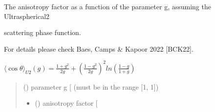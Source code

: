 \documentclass[letterpaper,10pt,english]{sphinxmanual}
\begin{document}

\begin{fulllineitems}
\label{\detokenize{06_anisotropy_factor:skinoptics.anisotropy_factor.costheta_U2}}
\pysigstartsignatures
{}
\pysigstopsignatures
\begin{DUlineblock}{0em}
\item[] The anisotropy factor as a function of the parameter g, assuming the Ultraspherical\sphinxhyphen{}2
\item[] scattering phase function.
\item[] For details please check Baes, Camps \& Kapoor 2022 {[}BCK22{]}.
\end{DUlineblock}

\sphinxAtStartPar
\(\langle \cos\theta \rangle_{U2}(g) = \frac{1+g^2}{2g} + \left(\frac{1-g^2}{2g}\right)^2 ln\left(\frac{1-g}{1+g}\right)\)
\begin{quote}\begin{description}
\sphinxAtStartPar
{} () \textendash{} parameter g {[}\sphinxhyphen{}{]} (must be in the range {[}\sphinxhyphen{}1, 1{]})

\sphinxAtStartPar
\begin{itemize}
\item {} 
\sphinxAtStartPar
{} () \textendash{} anisotropy factor {[}\sphinxhyphen{}{]}

\end{itemize}


\end{description}\end{quote}

\end{fulllineitems}

\end{document}
